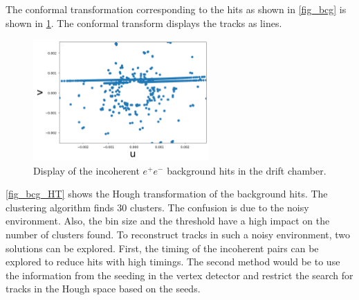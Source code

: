 The conformal transformation corresponding to the hits as shown in \cref{fig_bcg} is shown in \cref{fig_bcg_CT}. The conformal transform displays the tracks as lines.

\begin{figure}[ht]
	\centering
	\includegraphics[width=0.6\textwidth]{figures/CT_background.pdf}%
	\caption{Display of the incoherent $e^+e^-$ background hits in the drift chamber.}
	\label{fig_bcg_CT}
\end{figure}

\cref{fig_bcg_HT} shows the Hough transformation of the background hits. The clustering algorithm finds 30 clusters. The confusion is due to the noisy environment. Also, the bin size and the threshold have a high impact on the number of clusters found. To reconstruct tracks in such a noisy environment, two solutions can be explored. First, the timing of the incoherent pairs can be explored to reduce hits with high timings. The second method would be to use the information from the seeding in the vertex detector and restrict the search for tracks in the Hough space based on the seeds.

